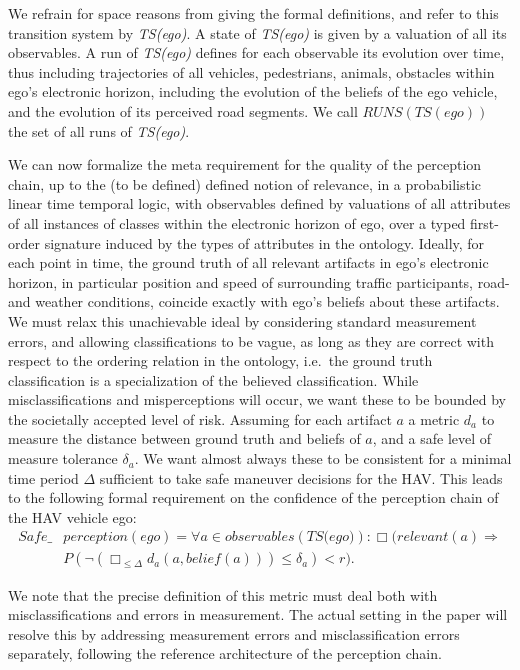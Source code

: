 We refrain for space reasons from giving the formal definitions, and refer to this transition system by \textit{TS(ego)}. A state of \textit{TS(ego)} is given by a valuation of all its observables. A run of \textit{TS(ego)} defines for each observable its evolution over time, thus including trajectories of all vehicles, pedestrians, animals, obstacles within ego's electronic horizon, including the evolution of the beliefs of the ego vehicle, and the evolution of its perceived road segments. We call $RUNS(TS(ego))$ the set of all runs of \textit{TS(ego)}.

We can now formalize the meta requirement for the quality of the perception chain, up to the (to be defined) defined notion of relevance, in a probabilistic linear time temporal logic, with observables defined by valuations of all attributes of all instances of classes within the electronic horizon of ego, over a typed first-order signature induced by the types of attributes in the ontology. Ideally, for each point in time, the ground truth of all relevant artifacts in ego's electronic horizon, in particular position and speed of surrounding traffic participants, road- and weather conditions, coincide exactly with ego's beliefs about these artifacts. We must relax this unachievable ideal by considering standard measurement errors, and allowing classifications to be vague, as long as they are correct with respect to the ordering relation in the ontology, i.e.\ the ground truth classification is a specialization of the believed classification. While misclassifications and misperceptions will occur, we want these to be bounded by the societally accepted level of risk. Assuming for each artifact $a$ a metric $d_a$ to measure the distance between ground truth and beliefs of $a$, and a safe level of measure tolerance $\delta_a$. We want almost always these to be consistent for a minimal time period $\Delta$ sufficient to take safe maneuver decisions for the HAV. This leads to the following formal requirement on the confidence of the perception chain of the HAV vehicle ego:
\begin{align}\label{eq:safeperception}
	\textit{Safe}\_ &\textit{perception}(ego) =\forall a \in \textit{observables}(\textit{TS(ego)}):  \Box (\textit{relevant}(a) \Rightarrow\\ 
			&P(\neg(\Box_{\leq\Delta}d_a(a, \textit{belief}(a)))\leq \delta_a) < r).\nonumber
\end{align}

We note that the precise definition of this metric must deal both with misclassifications and errors in measurement. The actual setting in the paper will resolve this by addressing measurement errors and misclassification errors separately, following the reference architecture of the perception chain. 
